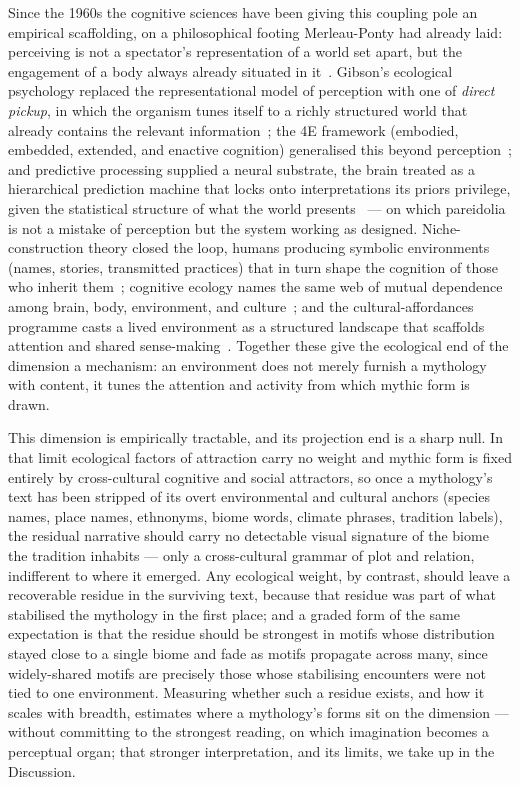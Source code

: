 \documentclass[11pt,a4paper]{article}
\begin{document}
Since the 1960s the cognitive sciences have been giving this coupling
pole an empirical scaffolding, on a philosophical footing
Merleau-Ponty had already laid: perceiving is not a spectator's
representation of a world set apart, but the engagement of a body
always already situated in it~\citep{merleauponty1945phenomenology}.
Gibson's ecological psychology replaced the representational model of
perception with one of \emph{direct pickup}, in which the organism
tunes itself to a richly structured world that already contains the
relevant information~\citep{gibson1979ecological}; the 4E framework
(embodied, embedded, extended, and enactive cognition) generalised this
beyond perception~\citep{varela1991embodied,clark1998extended,noe2004action};
and predictive processing supplied a neural substrate, the brain
treated as a hierarchical prediction machine that locks onto
interpretations its priors privilege, given the statistical structure
of what the world
presents~\citep{friston2010free,clark2016surfing,hohwy2013predictive}
--- on which pareidolia is not a mistake of perception but the system
working as designed. Niche-construction theory closed the loop, humans
producing symbolic environments (names, stories, transmitted practices)
that in turn shape the cognition of those who inherit
them~\citep{odlingsmee2003niche,constant2018variational}; cognitive
ecology names the same web of mutual dependence among brain, body,
environment, and culture~\citep{hutchins2010cognitive}; and the
cultural-affordances programme casts a lived environment as a
structured landscape that scaffolds attention and shared
sense-making~\citep{ramstead2016cultural}. Together these give the
ecological end of the dimension a mechanism: an environment does not
merely furnish a mythology with content, it tunes the attention and
activity from which mythic form is drawn.

This dimension is empirically tractable, and its projection end is a
sharp null. In that limit ecological factors of attraction carry no
weight and mythic form is fixed entirely by cross-cultural cognitive
and social attractors, so once a mythology's text has been stripped of
its overt environmental and cultural anchors (species names, place
names, ethnonyms, biome words, climate phrases, tradition labels), the
residual narrative should carry no detectable visual signature of the
biome the tradition inhabits --- only a cross-cultural grammar of plot
and relation, indifferent to where it emerged. Any ecological weight,
by contrast, should leave a recoverable residue in the surviving text,
because that residue was part of what stabilised the mythology in the
first place; and a graded form of the same expectation is that the
residue should be strongest in motifs whose distribution stayed close
to a single biome and fade as motifs propagate across many, since
widely-shared motifs are precisely those whose stabilising encounters
were not tied to one environment. Measuring whether such a residue
exists, and how it scales with breadth, estimates where a mythology's
forms sit on the dimension --- without committing to the strongest
reading, on which imagination becomes a perceptual organ; that stronger
interpretation, and its limits, we take up in the Discussion.
\end{document}
